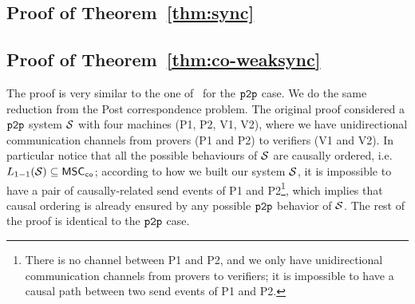 \subsection{Proof of Theorem~\ref{thm:sync}}
\label{apx:sync}



\subsection{Proof of Theorem~\ref{thm:co-weaksync}}
\label{apx:thm-co-weak-sync}
\thmCoWeakSync*


The proof is very similar to the one of~\cite[Theorem~20]{BolligGFLLS21-long} for the $\mathtt{p2p}$ case. 
We do the same reduction from the Post correspondence problem. 
The original proof considered a $\mathtt{p2p}$ system $\mathcal{S}$ with four machines (P1, P2, V1, V2), where we have 
unidirectional communication channels from provers (P1 and P2) to verifiers (V1 and V2). In particular notice 
that all the possible behaviours of $\mathcal{S}$ are causally ordered, i.e. $L_{1\mathsf{-}1}(\mathcal{S}) \subseteq \mathsf{MSC}_{\mathtt{co}}$; 
according to how we built our system $\mathcal{S}$, it is impossible to have a pair of causally-related send 
events of P1 and P2\footnote{There is no channel between P1 and P2, and we only have unidirectional communication 
channels from provers to verifiers; it is impossible to have a causal path between two send events of P1 and P2.}, which implies that causal ordering is 
already ensured by any possible $\mathtt{p2p}$ behavior of $\mathcal{S}$. The rest of the proof is identical to the 
$\mathtt{p2p}$ case.
